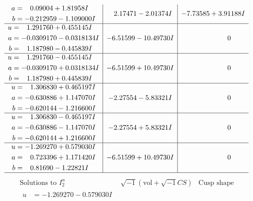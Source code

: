 \documentclass[1p]{elsarticle_modified}
\theoremstyle{definition}
\newcommand{\I}{\sqrt{-1}}
\begin{document}
$$\begin{array}{c|c|c}
\begin{aligned}
a &= \phantom{-}0.09004 + 1.81958 I \\
b &= -0.212959 - 1.109000 I\end{aligned}
 & \phantom{-}2.17471 - 2.01374 I & -7.73585 + 3.91188 I \\ \hline\begin{aligned}
u &= \phantom{-}1.291760 + 0.455145 I \\
a &= -0.0309170 - 0.0318134 I \\
b &= \phantom{-}1.187980 - 0.445839 I\end{aligned}
 & -6.51599 - 10.49730 I & \phantom{-0.000000 } 0 \\ \hline\begin{aligned}
u &= \phantom{-}1.291760 - 0.455145 I \\
a &= -0.0309170 + 0.0318134 I \\
b &= \phantom{-}1.187980 + 0.445839 I\end{aligned}
 & -6.51599 + 10.49730 I & \phantom{-0.000000 } 0 \\ \hline\begin{aligned}
u &= \phantom{-}1.306830 + 0.465197 I \\
a &= -0.630886 + 1.147070 I \\
b &= -0.620144 - 1.216600 I\end{aligned}
 & -2.27554 - 5.83321 I & \phantom{-0.000000 } 0 \\ \hline\begin{aligned}
u &= \phantom{-}1.306830 - 0.465197 I \\
a &= -0.630886 - 1.147070 I \\
b &= -0.620144 + 1.216600 I\end{aligned}
 & -2.27554 + 5.83321 I & \phantom{-0.000000 } 0 \\ \hline\begin{aligned}
u &= -1.269270 + 0.579030 I \\
a &= \phantom{-}0.723396 + 1.171420 I \\
b &= \phantom{-}0.81690 - 1.22821 I\end{aligned}
 & -6.51599 + 10.49730 I & \phantom{-0.000000 } 0\\
 \hline 
 \end{array}$$\newpage$$\begin{array}{c|c|c}  
\text{Solutions to }I^u_{2}& \I (\text{vol} + \sqrt{-1}CS) & \text{Cusp shape}\\
 \hline 
\begin{aligned}
u &= -1.269270 - 0.579030 I \\

\end{aligned}
\end{array}$$
\end{document}

